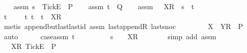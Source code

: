 \begin{isabellebody}
\ \ \isamarkupfalse%
\ assm{}{\isacharcolon}\ {\isachardoublequoteopen}s\ {\isacharat}\ {\isacharbrackleft}{\isacharbrackleft}Tick{\isacharbrackright}\isactrlsub E{\isacharbrackright}\ {\isasymin}\ P{\isachardoublequoteclose}\isanewline
\ \ \isamarkupfalse%
\ assm{}{\isacharcolon}\ {\isachardoublequoteopen}t\ {\isasymin}\ Q{\isachardoublequoteclose}\isanewline
\ \ \isamarkupfalse%
\ assm{}{\isacharcolon}\ {\isachardoublequoteopen}{\isasymrho}\ {\isacharat}\ {\isacharbrackleft}{\isacharbrackleft}X{\isacharbrackright}\isactrlsub R{\isacharbrackright}\ {\isacharequal}\ s\ {\isacharat}\ t{\isachardoublequoteclose}\isanewline
\ \ \isamarkupfalse%
\ {\isachardoublequoteopen}t\ {\isacharequal}\ {\isacharbrackleft}{\isacharbrackright}\ {\isasymor}\ {\isacharparenleft}{\isasymexists}\ t{\isacharprime}{\isachardot}\ t\ {\isacharequal}\ t{\isacharprime}\ {\isacharat}\ {\isacharbrackleft}{\isacharbrackleft}X{\isacharbrackright}\isactrlsub R{\isacharbrackright}{\isacharparenright}{\isachardoublequoteclose}\isanewline
\ \ \ \ \isamarkupfalse%
\ {\isacharparenleft}metis\ append{\isacharunderscore}butlast{\isacharunderscore}last{\isacharunderscore}id\ assm{}\ last{\isacharunderscore}appendR\ last{\isacharunderscore}snoc{\isacharparenright}\ \isanewline
\ \ \isamarkupfalse%
\ \isamarkupfalse%
\ {\isachardoublequoteopen}{\isasymrho}\ {\isacharat}\ {\isacharbrackleft}{\isacharbrackleft}X\ {\isasymunion}\ Y{\isacharbrackright}\isactrlsub R{\isacharbrackright}\ {\isasymin}\ P{\isachardoublequoteclose}\isanewline
\ \ \isamarkupfalse%
\ auto\isanewline
\ \ \ \ \isamarkupfalse%
\ case{\isacharunderscore}assm{\isacharcolon}\ {\isachardoublequoteopen}t\ {\isacharequal}\ {\isacharbrackleft}{\isacharbrackright}{\isachardoublequoteclose}\isanewline
\ \ \ \ \isamarkupfalse%
\ \isamarkupfalse%
\ {\isachardoublequoteopen}s\ {\isacharequal}\ {\isasymrho}\ {\isacharat}\ {\isacharbrackleft}{\isacharbrackleft}X{\isacharbrackright}\isactrlsub R{\isacharbrackright}{\isachardoublequoteclose}\isanewline
\ \ \ \ \ \ \isamarkupfalse%
\ {\isacharparenleft}simp\ add{\isacharcolon}\ assm{}{\isacharparenright}\isanewline
\ \ \ \ \isamarkupfalse%
\ \isamarkupfalse%
\ {\isachardoublequoteopen}{\isasymrho}\ {\isacharat}\ {\isacharbrackleft}{\isacharbrackleft}X{\isacharbrackright}\isactrlsub R{\isacharcomma}\ {\isacharbrackleft}Tick{\isacharbrackright}\isactrlsub E{\isacharbrackright}\ {\isasymin}\ P{\isachardoublequoteclose}\isanewline

\end{isabellebody}
